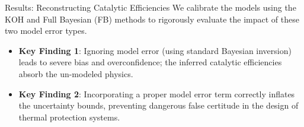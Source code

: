 \begin{frame}{Results: Reconstructing Catalytic Efficiencies}
    We calibrate the models using the KOH and Full Bayesian (FB) methods to rigorously evaluate the impact of these two model error types.
    
    \vspace{0.3cm}
    \begin{itemize}
        \item \textbf{Key Finding 1}: Ignoring model error (using standard Bayesian inversion) leads to severe bias and overconfidence; the inferred catalytic efficiencies absorb the un-modeled physics.
        \item \textbf{Key Finding 2}: Incorporating a proper model error term correctly inflates the uncertainty bounds, preventing dangerous false certitude in the design of thermal protection systems.
    \end{itemize}
\end{frame}
